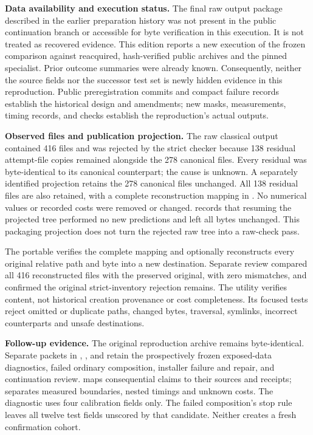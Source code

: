 \textbf{Data availability and execution status.} The final raw output package described in the earlier preparation history was not present in the public continuation branch or accessible for byte verification in this execution. It is not treated as recovered evidence. This edition reports a new execution of the frozen comparison against reacquired, hash-verified public archives and the pinned specialist. Prior outcome summaries were already known. Consequently, neither the source fields nor the successor test set is newly hidden evidence in this reproduction. Public preregistration commits and compact failure records establish the historical design and amendments; new masks, measurements, timing records, and checks establish the reproduction's actual outputs.

\textbf{Observed files and publication projection.} The raw classical output contained 416 files and was rejected by the strict checker because 138 residual attempt-file copies remained alongside the 278 canonical files. Every residual was byte-identical to its canonical counterpart; the cause is unknown. A separately identified projection retains the 278 canonical files unchanged. All 138 residual files are also retained, with a complete reconstruction mapping in . No numerical values or recorded costs were removed or changed.  records that resuming the projected tree performed no new predictions and left all bytes unchanged. This packaging projection does not turn the rejected raw tree into a raw-check pass.

The portable  verifies the complete mapping and optionally reconstructs every original relative path and byte into a new destination. Separate review compared all 416 reconstructed files with the preserved original, with zero mismatches, and confirmed the original strict-inventory rejection remains. The utility verifies content, not historical creation provenance or cost completeness. Its focused tests reject omitted or duplicate paths, changed bytes, traversal, symlinks, incorrect counterparts and unsafe destinations.

\textbf{Follow-up evidence.} The original reproduction archive remains byte-identical. Separate packets in , , and  retain the prospectively frozen exposed-data diagnostics, failed ordinary composition, installer failure and repair, and continuation review.  maps consequential claims to their sources and receipts;  separates measured boundaries, nested timings and unknown costs. The diagnostic uses four calibration fields only. The failed composition's stop rule leaves all twelve test fields unscored by that candidate. Neither creates a fresh confirmation cohort.

